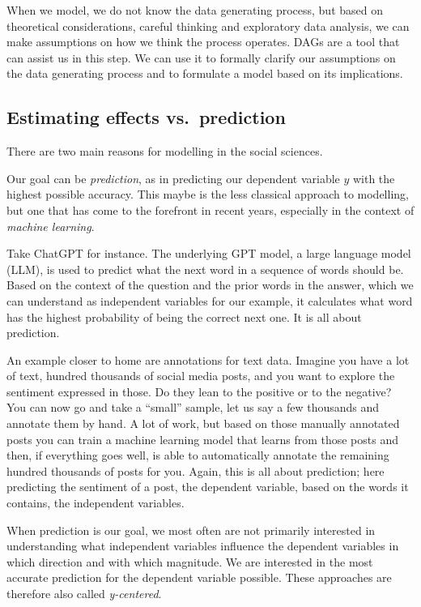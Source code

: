 \documentclass[
]{book}
\begin{document}
When we model, we do not know the data generating process, but based on
theoretical considerations, careful thinking and exploratory data analysis, we
can make assumptions on how we think the process operates. DAGs are a tool that can assist us in this step. We can use it to formally clarify our assumptions on the data generating process and to formulate a model based on its implications.

\hypertarget{estimating-effects-vs.-prediction}{%
\subsection{Estimating effects vs.~prediction}\label{estimating-effects-vs.-prediction}}

There are two main reasons for modelling in the social sciences.

Our goal can be \emph{prediction}, as in predicting our dependent variable \(y\) with
the highest possible accuracy. This maybe is the less classical approach to
modelling, but one that has come to the forefront in recent years, especially in
the context of \emph{machine learning}.

Take ChatGPT for instance. The underlying GPT model, a large language model
(LLM), is used to predict what the next word in a sequence of words should be.
Based on the context of the question and the prior words in the answer, which we
can understand as independent variables for our example, it calculates what word
has the highest probability of being the correct next one. It is all about
prediction.

An example closer to home are annotations for text data. Imagine you have a lot
of text, hundred thousands of social media posts, and you want to explore the
sentiment expressed in those. Do they lean to the positive or to the negative?
You can now go and take a ``small'' sample, let us say a few thousands and
annotate them by hand. A lot of work, but based on those manually annotated
posts you can train a machine learning model that learns from those posts and
then, if everything goes well, is able to automatically annotate the remaining
hundred thousands of posts for you. Again, this is all about prediction; here
predicting the sentiment of a post, the dependent variable, based on the words
it contains, the independent variables.

When prediction is our goal, we most often are not primarily interested in
understanding what independent variables influence the dependent variables in
which direction and with which magnitude. We are interested in the most accurate
prediction for the dependent variable possible. These approaches are therefore
also called \emph{y-centered}.
\end{document}
